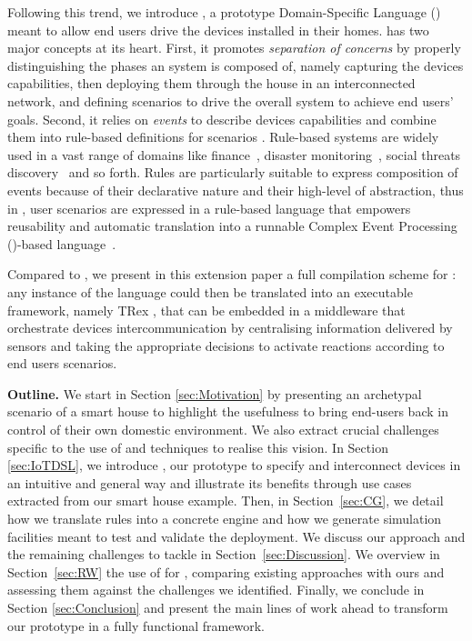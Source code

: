 Following this trend, we introduce \IOTDSL, a prototype Domain-Specific Language (\DSL) meant to allow end users drive the \IOT devices installed in their homes. \IOTDSL has two major concepts at its heart. First, it promotes \emph{separation of concerns} by properly distinguishing the phases an \IOT system is composed of, namely capturing the devices capabilities, then deploying them through the house in an interconnected network, and defining scenarios to drive the overall system to achieve end users' goals. Second, it relies on \emph{events} to describe devices capabilities and combine them into rule-based definitions for scenarios \cite{muhl-06,cristea-11}. Rule-based systems are widely used in a vast range of domains like finance~\cite{schultz-09}, disaster monitoring~\cite{broda-09}, social threats discovery~\cite{baran-13} and so forth. Rules are particularly suitable to express composition of events because of their declarative nature and their high-level of abstraction, thus in \IOTDSL, user scenarios are expressed in a rule-based language that empowers reusability and automatic translation into a runnable Complex Event Processing (\CEP)-based language~\cite{Cugola-Margara:2010}.

Compared to \cite{Amrani-Gilson-Debieche-Englebert:2017}, we present in this extension paper a full compilation scheme for \IOTDSL: any instance of the language could then be translated into an executable framework, namely TRex \cite{cugola-12}, that can be embedded in a middleware that orchestrate devices intercommunication by centralising information delivered by sensors and taking the appropriate decisions to activate reactions according to end users scenarios. 

\noindent
\textbf{Outline.} We start in Section \ref{sec:Motivation} by presenting an archetypal scenario of a smart house to highlight the usefulness to bring end-users back in control of their own domestic \IOT environment. We also extract crucial \IOT challenges specific to the use of \DSLS and \MDE techniques to realise this vision. In Section \ref{sec:IoTDSL}, we introduce \IOTDSL, our prototype \DSL to specify and interconnect devices in an intuitive and general way and illustrate its benefits through use cases extracted from our smart house example. Then, in Section~\ref{sec:CG}, we detail how we translate \IOTDSL rules into a concrete \CEP engine and how we generate simulation facilities meant to test and validate the \IOT deployment. We discuss our approach and the remaining challenges to tackle in Section~\ref{sec:Discussion}. We overview in Section~\ref{sec:RW} the use of \DSLS for \IOT, comparing existing approaches with ours and assessing them against the challenges we identified. Finally, we conclude in Section \ref{sec:Conclusion} and present the main lines of work ahead to transform our prototype in a fully functional \DSL framework.
